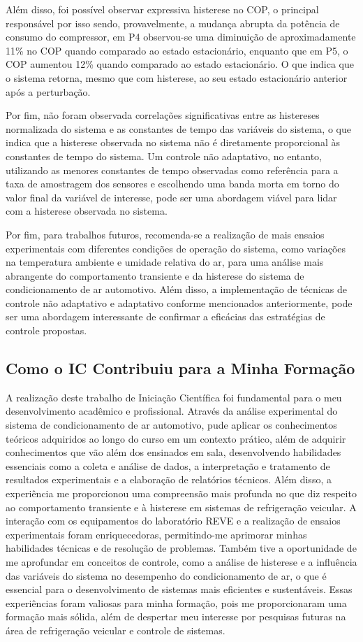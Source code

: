 Além disso, foi possível observar expressiva histerese no COP, o principal responsável por isso sendo, provavelmente, a mudança abrupta da potência de consumo do compressor, em P4  observou-se uma diminuição de aproximadamente 11\% no COP quando comparado ao estado estacionário, enquanto que em P5, o COP aumentou 12\% quando comparado ao estado estacionário.  O que indica que o sistema retorna, mesmo que com histerese, ao seu estado estacionário anterior após a perturbação.

Por fim, não foram observada correlações significativas entre as histereses normalizada do sistema e as constantes de tempo das variáveis do sistema, o que indica que a histerese observada no sistema não é diretamente proporcional às constantes de tempo do sistema. Um controle não adaptativo, no entanto, utilizando as menores constantes de tempo observadas como referência para a taxa de amostragem dos sensores e escolhendo uma banda morta em torno do valor final da variável de interesse, pode ser uma abordagem viável para lidar com a histerese observada no sistema.

Por fim, para trabalhos futuros, recomenda-se a realização de mais ensaios experimentais com diferentes condições de operação do sistema, como variações na temperatura ambiente e umidade relativa do ar, para uma análise mais abrangente do comportamento transiente e da histerese do sistema de condicionamento de ar automotivo. Além disso, a implementação de técnicas de controle não adaptativo e adaptativo conforme mencionados anteriormente, pode ser uma abordagem interessante de confirmar a eficácias das estratégias de controle propostas.

\subsection{Como o IC Contribuiu para a Minha Formação}

A realização deste trabalho de Iniciação Científica foi fundamental para o meu desenvolvimento acadêmico e profissional. Através da análise experimental do sistema de condicionamento de ar automotivo, pude aplicar os conhecimentos teóricos adquiridos ao longo do curso em um contexto prático, além de adquirir conhecimentos que vão além dos ensinados em sala, desenvolvendo habilidades essenciais como a coleta e análise de dados, a interpretação e tratamento de resultados experimentais e a elaboração de relatórios técnicos.  Além disso, a experiência me proporcionou uma compreensão mais profunda no que diz respeito ao comportamento transiente e à histerese em sistemas de refrigeração veicular. A interação com os equipamentos do laboratório REVE e a realização de ensaios experimentais foram enriquecedoras, permitindo-me aprimorar minhas habilidades técnicas e de resolução de problemas. Também tive a oportunidade de me aprofundar em conceitos de controle, como a análise de histerese e a influência das variáveis do sistema no desempenho do condicionamento de ar, o que é essencial para o desenvolvimento de sistemas mais eficientes e sustentáveis.
Essas experiências foram valiosas para minha formação, pois me proporcionaram uma formação mais sólida, além de despertar meu interesse por pesquisas futuras na área de refrigeração veicular e controle de sistemas. 
